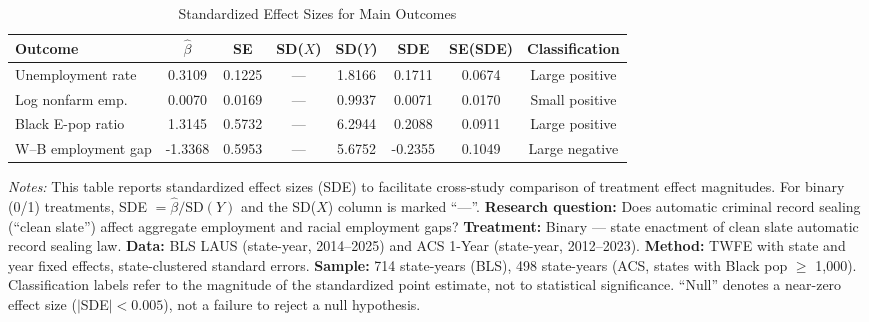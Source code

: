 \begin{table}[H]
\centering
\caption{Standardized Effect Sizes for Main Outcomes}
\label{tab:sde}
\begin{adjustbox}{max width=\textwidth}
\begin{tabular}{lccccccc}
\toprule
Outcome & $\hat{\beta}$ & SE & SD($X$) & SD($Y$) & SDE & SE(SDE) & Classification \\
\midrule
Unemployment rate & 0.3109 & 0.1225 & --- & 1.8166 & 0.1711 & 0.0674 & Large positive \\
Log nonfarm emp. & 0.0070 & 0.0169 & --- & 0.9937 & 0.0071 & 0.0170 & Small positive \\
Black E-pop ratio & 1.3145 & 0.5732 & --- & 6.2944 & 0.2088 & 0.0911 & Large positive \\
W--B employment gap & -1.3368 & 0.5953 & --- & 5.6752 & -0.2355 & 0.1049 & Large negative \\
\bottomrule
\end{tabular}
\end{adjustbox}
\par\vspace{0.3em}
{\footnotesize \emph{Notes:} This table reports standardized effect sizes (SDE) to facilitate cross-study comparison of treatment effect magnitudes. For binary (0/1) treatments, SDE $= \hat{\beta} / \text{SD}(Y)$ and the SD($X$) column is marked ``---''. \textbf{Research question:} Does automatic criminal record sealing (``clean slate'') affect aggregate employment and racial employment gaps? \textbf{Treatment:} Binary --- state enactment of clean slate automatic record sealing law. \textbf{Data:} BLS LAUS (state-year, 2014--2025) and ACS 1-Year (state-year, 2012--2023). \textbf{Method:} TWFE with state and year fixed effects, state-clustered standard errors. \textbf{Sample:} 714 state-years (BLS), 498 state-years (ACS, states with Black pop $\geq$ 1,000). Classification labels refer to the magnitude of the standardized point estimate, not to statistical significance. ``Null'' denotes a near-zero effect size ($|$SDE$| < 0.005$), not a failure to reject a null hypothesis.}
\end{table}

